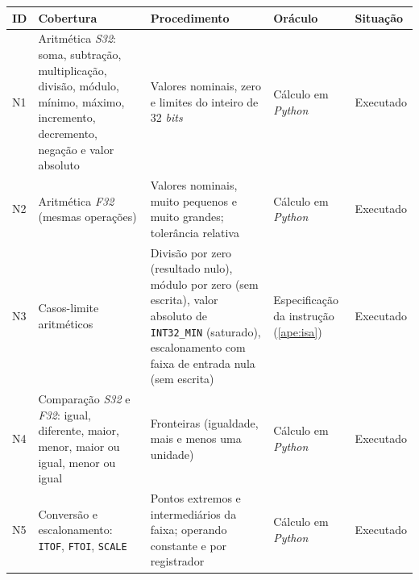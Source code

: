 \begin{quadrofixo}
    \centering
    \small\singlespacing
    \begin{tabular}{|p{0.8cm}|p{3.2cm}|p{4.8cm}|p{2.8cm}|p{2.3cm}|}
        \hline
        ID & Cobertura & Procedimento & Oráculo & Situação \\
        \hline
        N1 & Aritmética \textit{S32}: soma, subtração, multiplicação, divisão, módulo, mínimo, máximo, incremento, decremento, negação e valor absoluto & Valores nominais, zero e limites do inteiro de 32 \textit{bits} & Cálculo em \textit{Python} & Executado \\
        \hline
        N2 & Aritmética \textit{F32} (mesmas operações) & Valores nominais, muito pequenos e muito grandes; tolerância relativa & Cálculo em \textit{Python} & Executado \\
        \hline
        N3 & Casos-limite aritméticos & Divisão por zero (resultado nulo), módulo por zero (sem escrita), valor absoluto de \texttt{INT32\_MIN} (saturado), escalonamento com faixa de entrada nula (sem escrita) & Especificação da instrução (\ref{ape:isa}) & Executado \\
        \hline
        N4 & Comparação \textit{S32} e \textit{F32}: igual, diferente, maior, menor, maior ou igual, menor ou igual & Fronteiras (igualdade, mais e menos uma unidade) & Cálculo em \textit{Python} & Executado \\
        \hline
        N5 & Conversão e escalonamento: \texttt{ITOF}, \texttt{FTOI}, \texttt{SCALE} & Pontos extremos e intermediários da faixa; operando constante e por registrador & Cálculo em \textit{Python} & Executado \\
        \hline
    \end{tabular}
    \label{qua:testes-numericos}
\end{quadrofixo}

